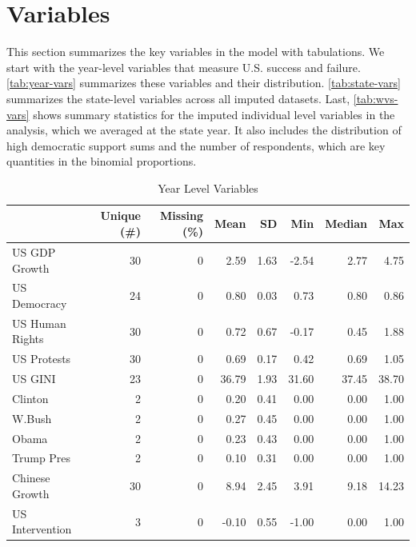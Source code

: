 \documentclass[12pt]{article}
\begin{document}
\section{Variables}


This section summarizes the key variables in the model with tabulations. 
We start with the year-level variables that measure U.S. success and failure. 
\autoref{tab:year-vars} summarizes these variables and their distribution. 
\autoref{tab:state-vars} summarizes the state-level variables across all imputed datasets.
Last, \autoref{tab:wvs-vars} shows summary statistics for the imputed individual level variables in the analysis, which we averaged at the state year. 
It also includes the distribution of high democratic support sums and the number of respondents, which are key quantities in the binomial proportions.
 
 
\begin{table}
\caption{\label{tab:year-vars}Year Level Variables}
\centering
\begin{tabular}[t]{lrrrrrrr}
\toprule
  & Unique (\#) & Missing (\%) & Mean & SD & Min & Median & Max\\
\midrule
US GDP Growth & 30 & 0 & 2.59 & 1.63 & -2.54 & 2.77 & 4.75\\
US Democracy & 24 & 0 & 0.80 & 0.03 & 0.73 & 0.80 & 0.86\\
US Human Rights & 30 & 0 & 0.72 & 0.67 & -0.17 & 0.45 & 1.88\\
US Protests & 30 & 0 & 0.69 & 0.17 & 0.42 & 0.69 & 1.05\\
US GINI & 23 & 0 & 36.79 & 1.93 & 31.60 & 37.45 & 38.70\\
Clinton & 2 & 0 & 0.20 & 0.41 & 0.00 & 0.00 & 1.00\\
W.Bush & 2 & 0 & 0.27 & 0.45 & 0.00 & 0.00 & 1.00\\
Obama & 2 & 0 & 0.23 & 0.43 & 0.00 & 0.00 & 1.00\\
Trump Pres & 2 & 0 & 0.10 & 0.31 & 0.00 & 0.00 & 1.00\\
Chinese Growth & 30 & 0 & 8.94 & 2.45 & 3.91 & 9.18 & 14.23\\
US Intervention & 3 & 0 & -0.10 & 0.55 & -1.00 & 0.00 & 1.00\\
\bottomrule
\end{tabular}
\end{table}
\end{document}
